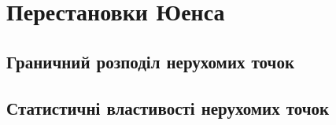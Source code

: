 \documentclass[12pt]{extreport}
\begin{document}
\tableofcontents
\chapter{Перестановки Юенса}
    \section{Граничний розподіл нерухомих точок}
        
    \section{Статистичні властивості нерухомих точок}
        
%         
%     
\newpage


\end{document}
